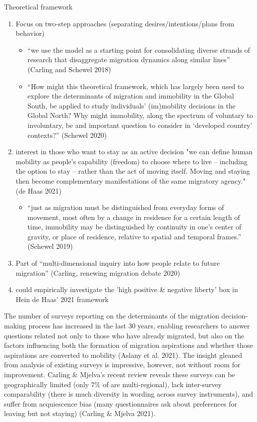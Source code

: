 Theoretical framework
\begin{enumerate}
    \item Focus on two-step approaches (separating desires/intentions/plans from behavior)
    \begin{itemize}
        \item “we use the model as a starting point for consolidating diverse strands of research that disaggregate migration dynamics along similar lines” (Carling and Schewel 2018)
        \item “How might this theoretical framework, which has largely been used to explore the determinants of migration and immobility in the Global South, be applied to study individuals’ (im)mobility decisions in the Global North? Why might immobility, along the spectrum of voluntary to involuntary, be and important question to consider in ‘developed country’ contexts?” (Schewel 2020)
    \end{itemize}
    \item interest in those who want to stay as an active decision "we can define human mobility as people’s capability (freedom) to choose where to live – including the option to stay – rather than the act of moving itself. Moving and staying then become complementary manifestations of the same migratory agency." (de Haas 2021)
    \begin{itemize}
        \item “just as migration must be distinguished from everyday forms of movement, most often by a change in residence for a certain length of time, immobility may be distinguished by continuity in one’s center of gravity, or place of residence, relative to spatial and temporal frames.” (Schewel 2019)
    \end{itemize}
    \item Part of “multi-dimensional inquiry into how people relate to future migration” (Carling, renewing migration debate 2020)
    \item could empirically investigate the 'high positive \& negative liberty' box in Hein de Haas' 2021 framework
\end{enumerate}
The number of surveys reporting on the determinants of the migration decision-making process has increased in the last 30 years, enabling researchers to answer questions related not only to those who have already migrated, but also on the factors influencing both the formation of migration aspirations and whether those aspirations are converted to mobility (Aslany et al. 2021). The insight gleaned from analysis of existing surveys is impressive, however, not without room for improvement. Carling & Mjelva's recent review reveals these surveys can be geographically limited (only 7\% of are multi-regional), lack inter-survey comparability (there is much diversity in wording across survey instruments), and suffer from acquiescence bias (many questionnaires ask about preferences for leaving but not staying) (Carling & Mjelva 2021).

